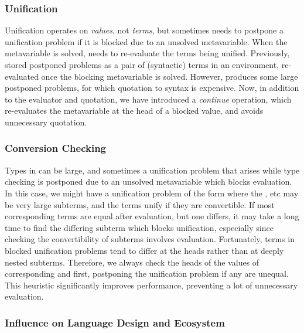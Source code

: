 \subsubsection*{Unification}

Unification operates on \emph{values}, not \emph{terms}, but sometimes \idris{}
needs to postpone a unification problem if it is blocked due to an unsolved
metavariable. When the metavariable is solved, \idris{} needs to re-evaluate the
terms being unified. Previously, \idris{} stored postponed problems as a pair
of (syntactic) terms in an environment, re-evaluated once the
blocking metavariable is solved.
However, \Frexlib{} produces some large postponed problems, for which quotation
to syntax is expensive.  Now, in addition to the evaluator and quotation, we
have introduced a \emph{continue} operation, which re-evaluates the
metavariable at the head of a blocked value, and avoids unnecessary quotation.

\subsubsection*{Conversion Checking}

Types in \Frexlib{} can be large, and sometimes a unification problem that arises
while type checking \Frexlib{} is postponed due to an unsolved
metavariable which blocks evaluation. In this case, we might have a
unification problem of the form
   
   
where the ,  etc may be very large subterms,
and the terms unify if they are convertible.
If most corresponding terms are equal after evaluation, but one differs, it may
take a long time to find the differing subterm which blocks unification,
especially since checking the convertibility of subterms involves evaluation.
Fortunately, terms in blocked unification problems
tend to differ at the heads rather than at deeply nested subterms. Therefore,
we always check the heads of the values of corresponding  and
 first, postponing the unification
problem if any are unequal. This heuristic significantly improves performance,
preventing a lot of unnecessary evaluation.

\subsubsection*{Influence on Language Design and Ecosystem}

